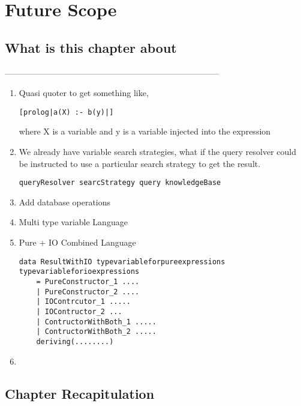 \documentclass[thesis-solanki.tex]{subfiles}
\begin{document}
\chapter{Future Scope}\label{chap:futureScope}


\section{What is this chapter about}

-----------------------------------------------------------------------------


\begin{enumerate}

\item Quasi quoter to get something like,
\begin{verbatim}
[prolog|a(X) :- b(y)|]
\end{verbatim}
where X is a   variable and y is a  variable injected into the expression


\item We already have variable search strategies, what if the query resolver could be instructed to use a particular search strategy to get 
the result.
\begin{verbatim}
queryResolver searcStrategy query knowledgeBase
\end{verbatim}


\item Add database operations

\item Multi type variable Language

\item Pure + IO Combined Language

\begin{verbatim}
data ResultWithIO typevariableforpureexpressions typevariableforioexpressions
	= PureConstructor_1 ....
	| PureConstructor_2 ....
	| IOContrcutor_1 .....
	| IOContructor_2 ...
	| ContructorWithBoth_1 .....
	| ContructorWithBoth_2 .....
	deriving(........)
\end{verbatim}

\item 

\end{enumerate}


\section{Chapter Recapitulation}
\end{document}
